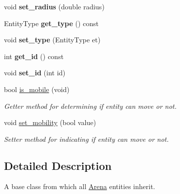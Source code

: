 \begin{DoxyCompactItemize}
\item 
void {\bfseries set\+\_\+radius} (double radius)\hypertarget{classArenaEntity_a2b0c2512fe53d143442da5e357f71505}{}\label{classArenaEntity_a2b0c2512fe53d143442da5e357f71505}

\item 
Entity\+Type {\bfseries get\+\_\+type} () const \hypertarget{classArenaEntity_a69a818480868f9b0417e6f9ed20dfc96}{}\label{classArenaEntity_a69a818480868f9b0417e6f9ed20dfc96}

\item 
void {\bfseries set\+\_\+type} (Entity\+Type et)\hypertarget{classArenaEntity_aa65c584906d4c22f61488fab98c3392c}{}\label{classArenaEntity_aa65c584906d4c22f61488fab98c3392c}

\item 
int {\bfseries get\+\_\+id} () const \hypertarget{classArenaEntity_aee353e402d9b8a7372fae30b7a0ce4a0}{}\label{classArenaEntity_aee353e402d9b8a7372fae30b7a0ce4a0}

\item 
void {\bfseries set\+\_\+id} (int id)\hypertarget{classArenaEntity_a67f4c0467d32eec76ee6ed033ff9ed2f}{}\label{classArenaEntity_a67f4c0467d32eec76ee6ed033ff9ed2f}

\item 
bool \hyperlink{classArenaEntity_a9cfea21220c07502abd084afde49ae65}{is\+\_\+mobile} (void)\hypertarget{classArenaEntity_a9cfea21220c07502abd084afde49ae65}{}\label{classArenaEntity_a9cfea21220c07502abd084afde49ae65}

\begin{DoxyCompactList}\small\item\em Getter method for determining if entity can move or not. \end{DoxyCompactList}\item 
void \hyperlink{classArenaEntity_adb5d3089fec5c28cc989e5834fcdaf6c}{set\+\_\+mobility} (bool value)\hypertarget{classArenaEntity_adb5d3089fec5c28cc989e5834fcdaf6c}{}\label{classArenaEntity_adb5d3089fec5c28cc989e5834fcdaf6c}

\begin{DoxyCompactList}\small\item\em Setter method for indicating if entity can move or not. \end{DoxyCompactList}\end{DoxyCompactItemize}


\subsection{Detailed Description}
A base class from which all \hyperlink{classArena}{Arena} entities inherit. 

